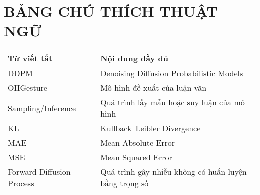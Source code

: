 
\pagebreak
{}
{}
\section*{\textbf{ \Large BẢNG CHÚ THÍCH THUẬT NGỮ}}

\begin{center}
\begin{tabular}{|p{5cm}|p{10cm}|}
\hline
\textbf{Từ viết tắt} & \textbf{Nội dung đầy đủ} \\
\hline
DDPM & Denoising Diffusion Probabilistic Models \\
\hline
OHGesture & Mô hình đề xuất của luận văn \\
\hline
Sampling/Inference & Quá trình lấy mẫu hoặc suy luận của mô hình \\
\hline
KL & Kullback–Leibler Divergence \\
\hline
MAE & Mean Absolute Error \\
\hline
MSE & Mean Squared Error \\
\hline
Forward Diffusion Process & Quá trình gây nhiễu không có huấn luyện bằng trọng số \\
\hline
\end{tabular}
\end{center}


\pagebreak

